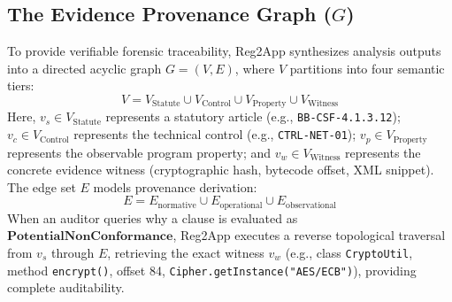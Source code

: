 \subsection{The Evidence Provenance Graph \texorpdfstring{($G$)}{(G)}}
\label{sec:engine:graph}

To provide verifiable forensic traceability, Reg2App synthesizes analysis outputs into a directed acyclic graph $G = (V, E)$, where $V$ partitions into four semantic tiers:
\begin{equation}
V = V_{\text{Statute}} \cup V_{\text{Control}} \cup V_{\text{Property}} \cup V_{\text{Witness}}
\end{equation}
Here, $v_s \in V_{\text{Statute}}$ represents a statutory article (e.g., \texttt{BB-CSF-4.1.3.12}); $v_c \in V_{\text{Control}}$ represents the technical control (e.g., \texttt{CTRL-NET-01}); $v_p \in V_{\text{Property}}$ represents the observable program property; and $v_w \in V_{\text{Witness}}$ represents the concrete evidence witness (cryptographic hash, bytecode offset, XML snippet). The edge set $E$ models provenance derivation:
\begin{equation}
E = E_{\text{normative}} \cup E_{\text{operational}} \cup E_{\text{observational}}
\end{equation}
When an auditor queries why a clause is evaluated as $\mathbf{PotentialNonConformance}$, Reg2App executes a reverse topological traversal from $v_s$ through $E$, retrieving the exact witness $v_w$ (e.g., class \texttt{CryptoUtil}, method \texttt{encrypt()}, offset 84, \texttt{Cipher.getInstance("AES/ECB")}), providing complete auditability.
